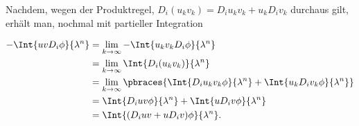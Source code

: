 \begin{solution}
Nachdem, wegen der Produktregel, $D_i(u_k v_k) = D_i u_k v_k + u_k D_i v_k$ durchaus gilt, erhält man, nochmal mit partieller Integration

\begin{align*}
  - \Int{uv D_i \phi}{\lambda^n}
  & = \lim_{k \to \infty} - \Int{u_k v_k D_i \phi}{\lambda^n} \\
  & = \lim_{k \to \infty} \Int{D_i(u_k v_k)}{\lambda^n} \\
  & = \lim_{k \to \infty}
      \pbraces
      {
        \Int{D_i u_k v_k \phi}{\lambda^n} +
        \Int{u_k D_i v_k \phi}{\lambda^n}
      } \\
  & = \Int{D_i u v \phi}{\lambda^n} +
      \Int{u D_i v \phi}{\lambda^n} \\
  & = \Int{(D_i u v + u D_i v) \phi}{\lambda^n}.
\end{align*}

\end{solution}
